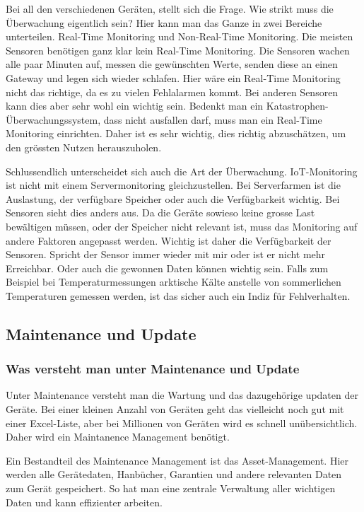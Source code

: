 \text Bei all den verschiedenen Geräten, stellt sich die Frage. Wie strikt muss die Überwachung eigentlich sein? Hier kann man das Ganze in zwei Bereiche unterteilen. Real-Time Monitoring und Non-Real-Time Monitoring. Die meisten Sensoren benötigen ganz klar kein Real-Time Monitoring. Die Sensoren wachen alle paar Minuten auf, messen die gewünschten Werte, senden diese an einen Gateway und legen sich wieder schlafen. Hier wäre ein Real-Time Monitoring nicht das richtige, da es zu vielen Fehlalarmen kommt. Bei anderen Sensoren kann dies aber sehr wohl ein wichtig sein. Bedenkt man ein Katastrophen-Überwachungssystem, dass nicht ausfallen darf, muss man ein Real-Time Monitoring einrichten. Daher ist es sehr wichtig, dies richtig abzuschätzen, um den grössten Nutzen herauszuholen.

Schlussendlich unterscheidet sich auch die Art der Überwachung. IoT-Monitoring ist nicht mit einem Servermonitoring gleichzustellen. Bei Serverfarmen ist die Auslastung, der verfügbare Speicher oder auch die Verfügbarkeit wichtig. Bei Sensoren sieht dies anders aus. Da die Geräte sowieso keine grosse Last bewältigen müssen, oder der Speicher nicht relevant ist, muss das Monitoring auf andere Faktoren angepasst werden. Wichtig ist daher die Verfügbarkeit der Sensoren. Spricht der Sensor immer wieder mit mir oder ist er nicht mehr Erreichbar. Oder auch die gewonnen Daten können wichtig sein. Falls zum Beispiel bei Temperaturmessungen arktische Kälte anstelle von sommerlichen Temperaturen gemessen werden, ist das sicher auch ein Indiz für Fehlverhalten.\cite{MonTypes}
\subsection{Maintenance und Update}
\subsubsection{Was versteht man unter Maintenance und Update}
Unter Maintenance versteht man die Wartung und das dazugehörige updaten der Geräte. Bei einer kleinen Anzahl von Geräten geht das vielleicht noch gut mit einer Excel-Liste, aber bei Millionen von Geräten wird es schnell unübersichtlich. Daher wird ein Maintanence Management benötigt.

Ein Bestandteil des Maintenance Management ist das Asset-Management. Hier werden alle Gerätedaten, Hanbücher, Garantien und andere relevanten Daten zum Gerät gespeichert.\cite{MainAsset} So hat man eine zentrale Verwaltung aller wichtigen Daten und kann effizienter arbeiten.

